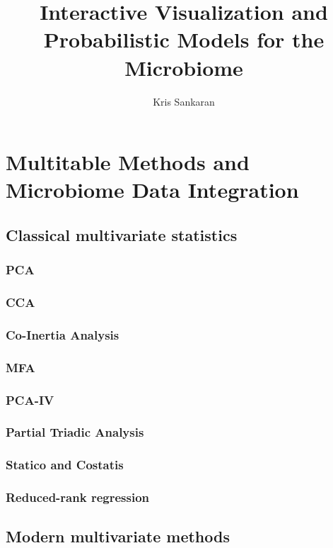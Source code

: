 \documentclass{report}
\title{Interactive Visualization and Probabilistic Models for the Microbiome}
\author{Kris Sankaran}
\begin{document}
\maketitle

\chapter{Multitable Methods and Microbiome Data Integration}

\section{Classical multivariate statistics}

\subsection{PCA}

\subsection{CCA}
\label{sec:cca}

\subsection{Co-Inertia Analysis}

\subsection{MFA}
\label{sec:mfa}

\subsection{PCA-IV}

\subsection{Partial Triadic Analysis}

\subsection{Statico and Costatis}

\subsection{Reduced-rank regression}
\label{sec:rr-reg}

\section{Modern multivariate methods}
\end{document}
